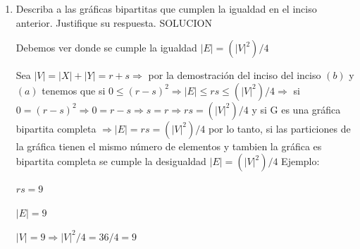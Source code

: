 \documentclass{article}
\begin{document}
\begin{enumerate}
\begin{enumerate}
\begin{proof}
  \end{proof}

  \item Describa a las gr\'aficas bipartitas que cumplen la igualdad en el
    inciso anterior. Justifique su respuesta.
SOLUCION

Debemos ver donde se cumple la igualdad $|E|= (|V|^2)/4$

Sea $|V|= |X| + |Y| = r+s \Longrightarrow$ por la demostración del inciso del inciso $(b)$ y $(a)$ tenemos que si $0\leqslant(r-s)^2 \Longrightarrow |E|\leqslant rs \leqslant (|V|^2)/4 \Longrightarrow$ si $0=(r-s)^2 \Longrightarrow 0=r-s \Longrightarrow s=r \Longrightarrow rs=(|V|^2)/4 $ y si G es una gráfica bipartita completa $\Longrightarrow |E|=rs=(|V|^2)/4$ por lo tanto, si las particiones de la gráfica tienen el mismo número de elementos y tambien la gráfica es bipartita completa se cumple la desigualdad $|E|= (|V|^2)/4$
\newpage
Ejemplo:
\begin{figure}[ht!]                                                             
    \centering                                              
\end{figure}
$rs=9$

$|E|=9$

$|V|= 9 \Longrightarrow |V|^2/4 = 36/4 = 9$
  \end{enumerate}

\end{enumerate}
\end{document}

